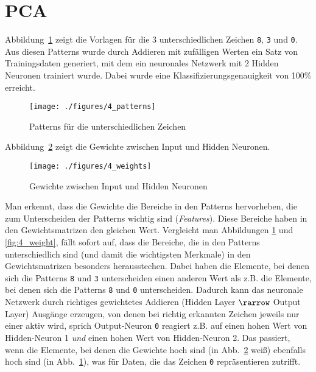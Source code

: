 \section{PCA}

Abbildung~\ref{fig:4_patterns} zeigt die Vorlagen für die 3 unterschiedlichen Zeichen \texttt{8}, \texttt{3} und \texttt{0}. Aus diesen Patterns wurde durch Addieren mit zufälligen Werten ein Satz von Trainingsdaten generiert, mit dem ein neuronales Netzwerk mit 2 Hidden Neuronen trainiert wurde. Dabei wurde eine Klassifizierungsgenauigkeit von 100\% erreicht.

\begin{figure}[h!]
  \begin{center}
    \texttt{[image: ./figures/4\_patterns]}
    \caption{Patterns für die unterschiedlichen Zeichen}
    \label{fig:4_patterns}
  \end{center}
\end{figure}

Abbildung~\ref{fig:4_weights} zeigt die Gewichte zwischen Input und Hidden Neuronen. 

\begin{figure}[h!]
  \begin{center}
    \texttt{[image: ./figures/4\_weights]}
    \caption{Gewichte zwischen Input und Hidden Neuronen}
    \label{fig:4_weights}
  \end{center}
\end{figure}

Man erkennt, dass die Gewichte die Bereiche in den Patterns hervorheben, die zum Unterscheiden der Patterns wichtig sind (\emph{Features}). Diese Bereiche haben in den Gewichtsmatrizen den gleichen Wert. Vergleicht man Abbildungen \ref{fig:4_patterns} und \ref{fig:4_weight}, fällt sofort auf, dass die Bereiche, die in den Patterns unterschiedlich sind (und damit die wichtigsten Merkmale) in den Gewichtsmatrizen besonders herausstechen. Dabei haben die Elemente, bei denen sich die Patterns \texttt{8} und \texttt{3} unterscheiden einen anderen Wert als z.B. die Elemente, bei denen sich die Patterns \texttt{8} und \texttt{0} unterscheiden. Dadurch kann das neuronale Netzwerk durch richtiges gewichtetes Addieren (Hidden Layer $\rarrow$ Output Layer) Ausgänge erzeugen, von denen bei richtig erkannten Zeichen jeweils nur einer aktiv wird, sprich Output-Neuron \texttt{0} reagiert z.B. auf einen hohen Wert von Hidden-Neuron 1 \emph{und} einen hohen Wert von Hidden-Neuron 2. Das passiert, wenn die Elemente, bei denen die Gewichte hoch sind (in Abb.~\ref{fig:4_weights} weiß) ebenfalls hoch sind (in Abb.~\ref{fig:4_patterns}), was für Daten, die das Zeichen \texttt{0} repräsentieren zutrifft.

